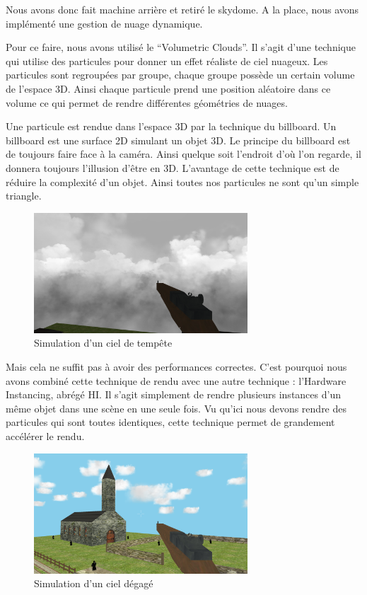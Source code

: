 \documentclass[11pt]{report}
\begin{document}
Nous avons donc fait machine arrière et retiré le skydome. A la place, nous avons implémenté une gestion de nuage dynamique.

Pour ce faire, nous avons utilisé le ``Volumetric Clouds''. Il s'agit d'une technique qui utilise des particules pour donner un effet réaliste de ciel nuageux. Les particules sont regroupées par groupe, chaque groupe possède un certain volume de l'espace 3D. Ainsi chaque particule prend une position aléatoire dans ce volume ce qui permet de rendre différentes géométries de nuages.

Une particule est rendue dans l'espace 3D par la technique du billboard. Un billboard est une surface 2D simulant un objet 3D. Le principe du billboard est de toujours faire face à la caméra. Ainsi quelque soit l'endroit d'où l'on regarde, il donnera toujours l'illusion d'être en 3D. L'avantage de cette technique est de réduire la complexité d'un objet. Ainsi toutes nos particules ne sont qu'un simple triangle.

\begin{figure}[htbp]
\centering
\includegraphics[width=8cm]{ciel_vue_haut.png}
\caption{Simulation d'un ciel de tempête}
\label{ciel-tempete}
\end{figure}

Mais cela ne suffit pas à avoir des performances correctes. C'est pourquoi nous avons combiné cette technique de rendu avec une autre technique : l'Hardware Instancing, abrégé HI. Il s'agit simplement de rendre plusieurs instances d'un même objet dans une scène en une seule fois. Vu qu'ici nous devons rendre des particules qui sont toutes identiques, cette technique permet de grandement accélérer le rendu.

\begin{figure}[htbp]
\centering
\includegraphics[width=8cm]{ciel_claire.png}
\caption{Simulation d'un ciel dégagé}
\label{ciel-bleu}
\end{figure}
\end{document}
